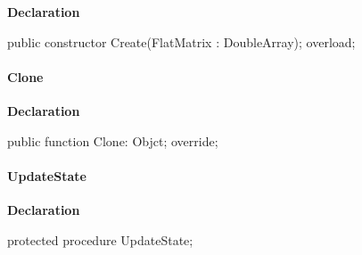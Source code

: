 \documentclass{report}
\newif\ifpdf
\begin{document}
\label{NewPascal.GUI.Geom.AffineTransform-Create}
\begin{list}{}{
\setlength{\itemindent}{0cm}
\setlength{\listparindent}{0cm}
\setlength{\leftmargin}{\evensidemargin}
\addtolength{\leftmargin}{\tmplength}
\settowidth{\labelsep}{X}
\addtolength{\leftmargin}{\labelsep}
\setlength{\labelwidth}{\tmplength}
}
\item[\textbf{Declaration}\hfill]
\ifpdf
\begin{flushleft}
\fi
\begin{ttfamily}
public constructor Create(FlatMatrix : DoubleArray); overload;\end{ttfamily}

\ifpdf
\end{flushleft}
\fi

\end{list}
\paragraph*{Clone}\hspace*{\fill}

\label{NewPascal.GUI.Geom.AffineTransform-Clone}
\begin{list}{}{
\setlength{\itemindent}{0cm}
\setlength{\listparindent}{0cm}
\setlength{\leftmargin}{\evensidemargin}
\addtolength{\leftmargin}{\tmplength}
\settowidth{\labelsep}{X}
\addtolength{\leftmargin}{\labelsep}
\setlength{\labelwidth}{\tmplength}
}
\item[\textbf{Declaration}\hfill]
\ifpdf
\begin{flushleft}
\fi
\begin{ttfamily}
public function Clone: Objct; override;\end{ttfamily}

\ifpdf
\end{flushleft}
\fi

\end{list}
\paragraph*{UpdateState}\hspace*{\fill}

\label{NewPascal.GUI.Geom.AffineTransform-UpdateState}
\begin{list}{}{
\setlength{\itemindent}{0cm}
\setlength{\listparindent}{0cm}
\setlength{\leftmargin}{\evensidemargin}
\addtolength{\leftmargin}{\tmplength}
\settowidth{\labelsep}{X}
\addtolength{\leftmargin}{\labelsep}
\setlength{\labelwidth}{\tmplength}
}
\item[\textbf{Declaration}\hfill]
\ifpdf
\begin{flushleft}
\fi
\begin{ttfamily}
protected procedure UpdateState;\end{ttfamily}

\ifpdf
\end{flushleft}
\fi

\end{list}
\end{document}
